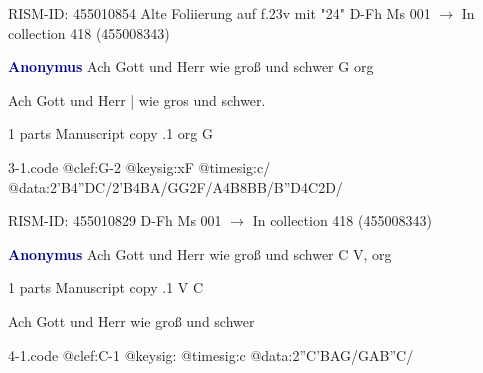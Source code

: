 \documentclass[twocolumn]{book}
\begin{document}
\newline RISM-ID: 455010854
\newline Alte Foliierung auf f.23v mit "24"
\newline D-Fh  Ms 001
\newline $\rightarrow$ In collection 418 (455008343)

\newline \par \vspace{7pt} \textcolor{darkblue}{\textbf{Anonymus  }}
\newline Ach Gott und Herr wie groß und schwer  G  
\newline org
\newline \begin{itshape}[f.15v, at left:] Ach Gott und Herr | wie gros und schwer.\end{itshape} 
\newline \textcolor{darkblue}{}  1 parts  
\newline Manuscript copy
.1  org  G  
\begin{filecontents*}{3-1.code}
@clef:G-2
@keysig:xF
@timesig:c/
@data:2'B4''DC/2'B4BA/GG2F/A4B{8BB}/{B''D}4C2D/
\end{filecontents*}
\newline
%

\newline RISM-ID: 455010829
\newline D-Fh  Ms 001
\newline $\rightarrow$ In collection 418 (455008343)

\newline \par \vspace{7pt} \textcolor{darkblue}{\textbf{Anonymus  }}
\newline Ach Gott und Herr wie groß und schwer  C  
\newline V, org
\newline \begin{itshape}\end{itshape} 
\newline \textcolor{darkblue}{}  1 parts  
\newline Manuscript copy
.1  V  C
\newline \begin{footnotesize} Ach Gott und Herr wie groß und schwer \end{footnotesize}  
\begin{filecontents*}{4-1.code}
@clef:C-1
@keysig:
@timesig:c
@data:2''C'BAG/GAB''C/
\end{filecontents*}
\newline
%
\end{document}

